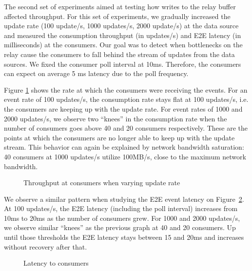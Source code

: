 The second set of experiments aimed at testing how writes to the relay buffer affected throughput. For this set of experiments, we gradually increased the update rate (100 update/s, 1000 updates/s, 2000 update/s) at the data source and measured the consumption throughput (in updates/s) and E2E latency (in milliseconds) at the consumers. Our goal was to detect when bottlenecks on the relay cause the consumers to fall behind the stream of updates from the data sources. We fixed the consumer poll interval at 10ms. Therefore, the consumers can expect on average 5 ms latency due to the poll frequency.   

Figure \ref{fig:throughput-poll10} shows the rate at which the consumers were receiving the events. For an event rate of 100 updates/s, the consumption rate stays flat at 100 updates/s, i.e. the consumers are keeping up with the update rate. For event rates of 1000 and 2000 updates/s, we observe two ``knees'' in the consumption rate when the number of consumers goes above 40 and 20 consumers respectively. These are the points at which the consumers are no longer able to keep up with the update stream. This behavior can again be explained by network bandwidth saturation: 40 consumers at 1000 updates/s utilize 100MB/s, close to the maximum network bandwidth. 

\begin{figure}
\centering
{}
\caption{Throughput at consumers when varying update rate}
\label{fig:throughput-poll10}
\end{figure}

We observe a similar pattern when studying the E2E event latency on Figure~\ref{fig:latency-poll10}. At 100 updates/s, the E2E latency (including the poll interval) increases from 10ms to 20ms as the number of consumers grew. For 1000 and 2000 updates/s, we observe similar ``knees'' as the previous graph at 40 and 20 consumers. Up until those thresholds the E2E latency stays between 15 and 20ms and increases without recovery after that. 

\begin{figure}
\centering
{}
\caption{Latency to consumers}
\label{fig:latency-poll10}
\end{figure}

